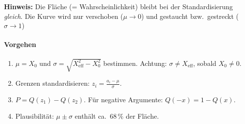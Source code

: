 \textbf{Hinweis:} Die Fl\"ache (= Wahrscheinlichkeit) bleibt bei der Standardisierung \emph{gleich}.
Die Kurve wird nur verschoben ($\mu \to 0$) und gestaucht bzw.\ gestreckt ($\sigma \to 1$)

\paragraph{Vorgehen}
\begin{enumerate}
  \item $\mu = X_0$ und $\sigma = \sqrt{X_{\mathrm{eff}}^2 - X_0^2}$ bestimmen.
        Achtung: $\sigma \neq X_{\mathrm{eff}}$, sobald $X_0 \neq 0$.
  \item Grenzen standardisieren: $z_i = \frac{a_i-\mu}{\sigma}$.
  \item $P = Q(z_1) - Q(z_2)$. F\"ur negative Argumente: $Q(-x) = 1 - Q(x)$.
  \item Plausibilit\"at: $\mu \pm \sigma$ enth\"alt ca.\ $68\,\%$ der Fl\"ache.
\end{enumerate}

\resizebox{0.8\columnwidth}{!}{
    
}